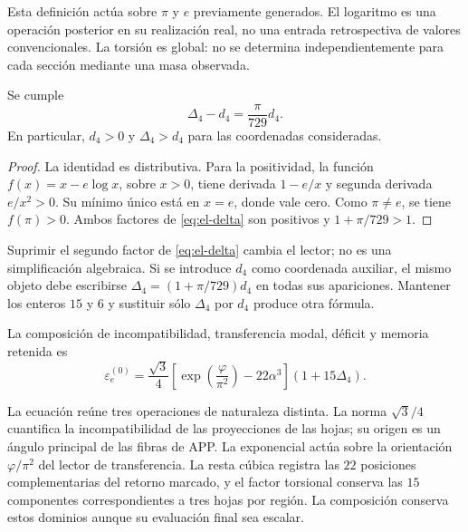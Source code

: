 Esta definición actúa sobre \(\pi\) y \(e\) previamente generados. El
logaritmo es una operación posterior en su realización real, no una
entrada retrospectiva de valores convencionales. La torsión es global:
no se determina independientemente para cada sección mediante una masa
observada.

\begin{lemma}
Se cumple
\begin{equation}
 \Delta_4-d_4=\frac{\pi}{729}d_4.
 \label{eq:el-delta-diferencia}
\end{equation}
En particular, \(d_4>0\) y \(\Delta_4>d_4\) para las coordenadas
consideradas.
\end{lemma}
\begin{proof}
La identidad es distributiva. Para la positividad, la función
\(f(x)=x-e\log x\), sobre \(x>0\), tiene derivada \(1-e/x\) y
segunda derivada \(e/x^2>0\). Su mínimo único está en \(x=e\), donde
vale cero. Como \(\pi\ne e\), se tiene \(f(\pi)>0\). Ambos factores
de \eqref{eq:el-delta} son positivos y \(1+\pi/729>1\).
\end{proof}

\begin{remark}
Suprimir el segundo factor de \eqref{eq:el-delta} cambia el lector; no
es una simplificación algebraica. Si se introduce \(d_4\) como
coordenada auxiliar, el mismo objeto debe escribirse
\(\Delta_4=(1+\pi/729)d_4\) en todas sus apariciones. Mantener los
enteros \(15\) y \(6\) y sustituir sólo \(\Delta_4\) por \(d_4\)
produce otra fórmula.
\end{remark}

\begin{definition}
La composición de incompatibilidad, transferencia modal, déficit y memoria retenida
es
\begin{equation}
 \varepsilon_e^{(0)}
 =\frac{\sqrt3}{4}
  \left[\exp\!\left(\frac{\varphi}{\pi^2}\right)-22\alpha^3\right]
  (1+15\Delta_4).
 \label{eq:el-basal}
\end{equation}
\end{definition}

La ecuación reúne tres operaciones de naturaleza distinta. La norma
\(\sqrt3/4\) cuantifica la incompatibilidad de las proyecciones de
las hojas; su origen es un ángulo principal de las fibras de APP.
La exponencial actúa sobre la orientación \(\varphi/\pi^2\) del
lector de transferencia. La resta cúbica registra las \(22\) posiciones
complementarias del retorno marcado, y el factor torsional conserva las
\(15\) componentes correspondientes a tres hojas por región. La
composición conserva estos dominios aunque su evaluación final sea escalar.

